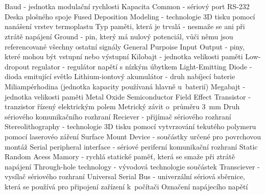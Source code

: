 \cleardoublepage
\chapter*{\listofabbrevname}
{}

\begin{acronym}[KolikMista]
		{Baud - jednotka modulační rychlosti}
		{Kapacita}
		{Common - sériový port RS-232}
		{Deska plošného spoje}
		{Fused Deposition Modeling - technologie 3D tisku pomocí nanášení vrstev termoplastu}
		{Typ paměti, která je trvalá - nesmaže se ani při ztrátě napájení}
		{Ground - pin, který má nulový potenciál, vůči němu jsou referencované všechny ostatní signály}
		{General Purpoise Input Output - piny, které mohou být vstupní nebo výstupní}
		{Kilobajt - jednotka velikosti paměti}
		{Low-dropout regulator - regulátor napětí s nízkým úbytkem}
		{Light-Emitting Diode - dioda emitující světlo}
		{Lithium-iontový akumulátor - druh nabíjecí baterie}
		{Miliampérhodina (jednotka kapacity používaná hlavně u~baterií)}
		{Megabajt - jednotka velikosti paměti}
		{Metal Oxide Semiconductor Field Effect Transistor - tranzistor řízený elektrickým polem}	
		{Metrický závit o~průměru 3~mm}
		{Druh sériového komunikačního rozhraní} 
		{Reciever - přijímač sériového rozhraní}
		{Stereolithography - technologie 3D tisku pomocí vytvrzování tekutého polymeru pomocí laserovéo záření}
		{Surface Mount Device - součástky určené pro povrchovou montáž} 
		{Serial peripheral interface - sériové periferní komunikační rozhraní}
		{Static Random Acess Mamory - rychlá statické paměť, která se smaže při ztrátě napájení}	
		{Through-hole technology - vývodová technologie součástek}
		{Transciever - vysílač sériového rozhraní} 
		{Universal Serial Bus - univerzální sériová sběrnice, která se používá pro připojení zařízení k~počítači}
		{Označení napájecího napětí}

\end{acronym}
